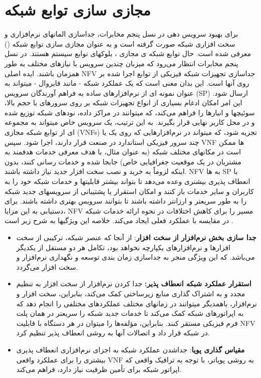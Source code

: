 \section{مجازی سازی توابع شبکه}
برای بهبود سرویس دهی در نسل پنجم مخابرات، جداسازی المانهای نرم‌افزاری و سخت افزاری شبکه صورت گرفته است و به عنوان 
مجازی سازی توابع شبکه () 
معرفی شده است.
  حال توابع شبکه ی مجازی
  ،
  بلوکهای توابع سیستم هستند.
در نسل پنجم مخابرات 
  انتظار می‌رود که
   میزبان چندین سرویس
   با نیازهای مختلف به طور همزمان
    باشند.
    ایده اصلی NFV جداسازی تجهیزات شبکه فیزیکی از توابع اجرا شده بر روی آنها است. این بدان معنی است که یک عملکرد شبکه - مانند فایروال - میتواند به عنوان نمونه ای از نرم‌افزارهای ساده به فراهم آورندگان سرویس (SP)  ارسال شود.
    این امر امکان ادغام بسیاری از انواع تجهیزات شبکه بر روی سرورهای با حجم بالا، سوئیچها و انبارها را فراهم می‌کند، که میتوانند در مراکز داده، نودهای شبکه توزیع شده و در محل کاربر نهایی قرار بگیرند.
    به این ترتیب، یک سرویس خاص میتواند به مجموعه ای از توابع شبکه مجازی (VNFs) تجزیه شود، که میتواند در نرم‌افزارهایی که روی یک یا چند سرور فیزیکی استاندارد در صنعت قرار دارند، اجرا شود.
    سپس VNF ها ممکن است در مکانهای مختلف شبکه (به عنوان مثال، با هدف معرفی خدمات هدفمند به مشتریان در یک موقعیت جغرافیایی خاص) جابجا شده و خدمات رسانی کنند، بدون اینکه لزوماً به خرید و نصب سخت افزار جدید نیاز داشته باشند.
    NFV به 
    ها SP 
   با انعطاف پذیری بیشتری وعده می‌دهد تا بتواند بیشتر قابلیتها و خدمات شبکه خود را به کاربران و سایر خدمات باز کنند و امکان استقرار یا پشتیبانی از سرویسهای جدید شبکه را  به طور سریعتر و ارزانتر داشته باشند تا بتوانند  سرویس بهتری داشته باشند.
   برای دستیابی به این مزایا، NFV مسیر را برای کاهش اختلافات در نحوه ارائه خدمات شبکه در مقایسه با عملکرد فعلی ایجاد می‌کند. خلاصه این ویژگیها به شرح زیر است
   \cite{NFV}.
 \begin{itemize}
  \item \textbf{جدا سازی بخش نرم‌افزار از سخت افزار}:
از آنجا که عنصر شبکه، ترکیبی از سخت افزارها و نرم‌افزارهای یکپارچه نخواهد بود، تکامل هر دو مستقل از یکدیگر می‌باشد.
که این ویژگی منجر به جداسازی زمان بندی توسعه و نگهداری نرم‌افزار و سخت افزار می‌گردد.
\item \textbf{استقرار عملکرد شبکه انعطاف پذیر:}
جدا کردن نرم‌افزار از سخت افزار به تنظیم مجدد و به اشتراک گذاری منابع زیرساختی کمک می‌کند،
بنابراین، سخت افزار و نرم‌افزار، باهمدیگر
میتوانند در زمانهای مختلف عملکردهای مختلفی را انجام دهد که به اپراتورهای شبکه کمک می‌کند تا خدمات جدید شبکه را سریعتر در همان پلت فرم فیزیکی مستقر کنند.
بنابراین،
مؤلفه‌ها را میتوان در هر دستگاه با قابلیت NFV در شبکه قرار داد و اتصالات آنها به روشی انعطاف پذیر تنظیم کرد.
\item \textbf{مقیاس گذاری پویا}:
  جداشدن عملکرد شبکه به اجزای نرم‌افزاری انعطاف پذیری بیشتری را برای  عملکرد واقعی VNF به روشی پویاتر، 
   با توجه به ترافیک واقعی که اپراتور شبکه برای تأمین ظرفیت نیاز دارد،
  فراهم می‌کند.
\end{itemize}  
